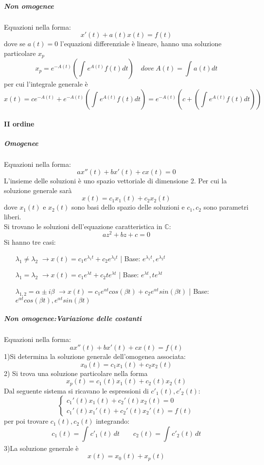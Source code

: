\documentclass[a4paper, titlepage]{report}%
\theoremstyle{definition} %
\theoremstyle{plain}
\theoremstyle{plain}
\theoremstyle{remark}
\theoremstyle{remark}
\theoremstyle{plain}
\theoremstyle{plain}
\theoremstyle{plain}
\theoremstyle{plain}
\theoremstyle{plain}
\begin{document}
    
     \subparagraph*{Non omogenee}
Equazioni nella forma:
\[
     x'(t) + a(t)x(t) =  f(t) 
\]
dove se $a(t) = 0$ l'equazioni differenziale è lineare, hanno una
soluzione particolare $x_p$
\[
       x_p = e^{-A(t)}(\int_{}^{}e^{A(t)}f(t)dt)
       \quad dove \ A(t) = \int_{}^{}a(t)dt
\]
per cui l'integrale generale è
\[
    x(t)= ce^{-A(t)} + e^{-A(t)}(\int_{}^{}e^{A(t)}f(t)dt) =
    e^{-A(t)}(c + (\int_{}^{}e^{A(t)}f(t)dt))
\]










\paragraph*{II ordine}
\subparagraph*{Omogenee}
Equazioni nella forma:
\[
     ax''(t) + bx'(t) + cx(t)= 0
\]
L'insieme delle soluzioni è uno spazio vettoriale di dimensione
2. Per cui la soluzione generale sarà
\[
     x(t)= c_1 x_1(t) + c_2x_2(t)    
\]
dove $x_1(t)$ e $x_2(t)$ sono basi dello spazio delle soluzioni e 
$c_1,c_2$ sono parametri liberi. \\
Si trovano le soluzioni dell'equazione caratteristica in $\mathbb{C}$:
\[
     az^2 + bz +c = 0    
\]
Si hanno tre casi:
\begin{enumerate}
    \item[$\lambda_1 \neq \lambda_2$] 
    $\rightarrow x(t)= c_1e^{\lambda_1 t}+ c_2e^{\lambda_2 t}$ |
    Base: $e^{\lambda_1 t},e^{\lambda_2 t}$
    \item[$\lambda_1 = \lambda_2$] 
    $\rightarrow x(t)= c_1e^{\lambda t}+ c_2te^{\lambda t}$ |
    Base: $e^{\lambda t}, te^{\lambda t}$
    \item[$\lambda_{1,2} = \alpha \pm i\beta$] 
    $\rightarrow x(t)= c_1e^{\alpha t}cos(\beta t)+ c_2
    e^{\alpha t}sin(\beta t)$ |
    Base: $e^{\alpha t}cos(\beta t),e^{\alpha t}sin(\beta t)$ 
\end{enumerate}

\subparagraph*{Non omogenee:Variazione delle costanti}
Equazioni nella forma:
\[
     ax''(t) + bx'(t) + cx(t)= f(t)
\]
1)Si determina la soluzione generale dell'omogenea associata:
\[
     x_0(t) = c_1 x_1(t) + c_2x_2(t)    
\]
2) Si trova una soluzione particolare nella forma
\[
     x_p(t) = c_1(t) x_1(t) + c_2(t) x_2(t)    
\]
Dal seguente sistema si ricavano le espressioni di $c'_1(t), c'_2(t)$:
\[
   \begin{cases}
    c_1'(t) x_1(t) + c_2'(t) x_2(t) = 0 
    \\
    c_1'(t) x_1'(t) + c_2'(t) x_2'(t) = f(t)
   \end{cases}    
\]
per poi trovare $c_1(t), c_2(t)$ integrando:
\[
    c_1(t) = \int_{}^{} c'_1(t) \, dt \qquad c_2(t) = \int_{}^{} c'_2(t) \,dt
\]
3)La soluzione generale è
\[
      x(t)= x_0(t) + x_p(t)    
\]
\end{document}
